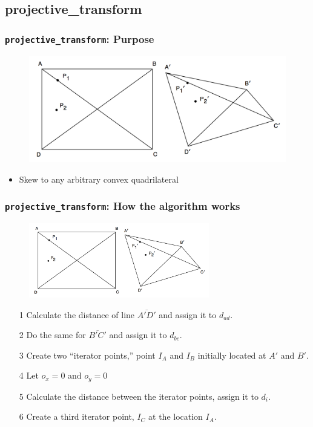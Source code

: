 \documentclass{beamer}
\begin{document}
\subsection{projective\_transform}
\begin{frame}
	\frametitle{{\tt projective\_transform}: Purpose}
	\begin{figure}
		\centering
		\includegraphics[width=\textwidth]{../proposal/arbiskew_graphic.png}
	\end{figure}
	\begin{itemize}
		\item Skew to any arbitrary convex quadrilateral
	\end{itemize}
\end{frame}

\begin{frame}
	\frametitle{{\tt projective\_transform}: How the algorithm works}
	\begin{figure}
		\centering
		\includegraphics[width=0.7\textwidth]{../proposal/arbiskew_graphic.png}
	\end{figure}
	\begin{enumerate}
		\item[1] Calculate the distance of line $\overline{A\prime D\prime}$ and assign it to $d_{ad}$.
		\item[2] Do the same for $\overline{B\prime C\prime}$ and assign it to $d_{bc}$.
		\item[3] Create two ``iterator points,'' point $I_A$ and $I_B$ initially located at $A\prime$ and $B\prime$.
		\item[4] Let $o_x = 0$ and $o_y = 0$
		\item[5] Calculate the distance between the iterator points, assign it to $d_i$.
		\item[6] Create a third iterator point, $I_C$ at the location $I_A$.
	\end{enumerate}
\end{frame}
\end{document}
